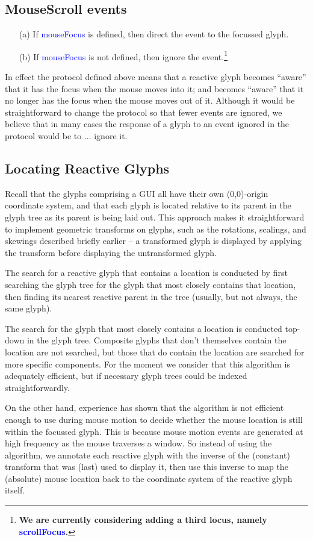 \documentclass[12pt,a4paper]{article}
\def\Scala#1{\textcolor{blue}{\textsf{#1}}}
\def\SS#1{\subsection{#1}}
\begin{document}
\SS{MouseScroll events}
\begin{itemize}
    \item[(a)] If \Scala{mouseFocus} is defined, then direct the event to the focussed glyph.
    \item[(b)] If \Scala{mouseFocus} is not defined, then ignore the
               event.\footnote{\textbf{We are currently considering
               adding a third locus, namely \Scala{scrollFocus}.}}
\end{itemize}


 


In effect the protocol defined above means that a reactive glyph becomes ``aware'' that it has the focus
when the mouse moves into it; and becomes ``aware'' that it no longer has the focus
when the mouse moves out of it. Although it would be straightforward to change the
protocol so that fewer events are ignored, we believe that in many cases the
response of a glyph to an event ignored in the protocol would be to ... ignore it.


\SS{Locating Reactive Glyphs}\label{locatingreactiveglyphs}
Recall that the glyphs comprising a GUI all have their own
(0,0)-origin coordinate system, and that each glyph is located
relative to its parent in the glyph tree as its parent is being
laid out. This approach makes it straightforward to implement
geometric transforms on glyphs, such as the rotations, scalings, and
skewings described briefly earlier -- a transformed glyph is
displayed by applying the transform before displaying
the untransformed glyph. 

The search for a reactive glyph that contains a location is conducted
by first searching the glyph tree for the glyph
that most closely contains that location, then finding its nearest
reactive parent in the tree (usually, but not always, the same
glyph).

The search for the glyph that most closely contains a location is
conducted top-down in the glyph tree.  Composite glyphs that don't
themselves contain the location are not searched, but those that
do contain the location are searched for more specific components.
For the moment we consider that this algorithm is adequately
efficient, but if necessary glyph trees could be indexed
straightforwardly.


On the other hand, experience has shown that the algorithm
is not efficient enough to use during mouse motion to decide
whether the mouse location is still within the focussed glyph. This is
because mouse motion events are generated at high frequency as the
mouse traverses a window. So instead of using the algorithm, we
annotate each reactive glyph with the inverse of the (constant)
transform that was (last) used to display it, then use this
inverse to map the (absolute) mouse location back to the coordinate
system of the reactive glyph itself.
\end{document}
